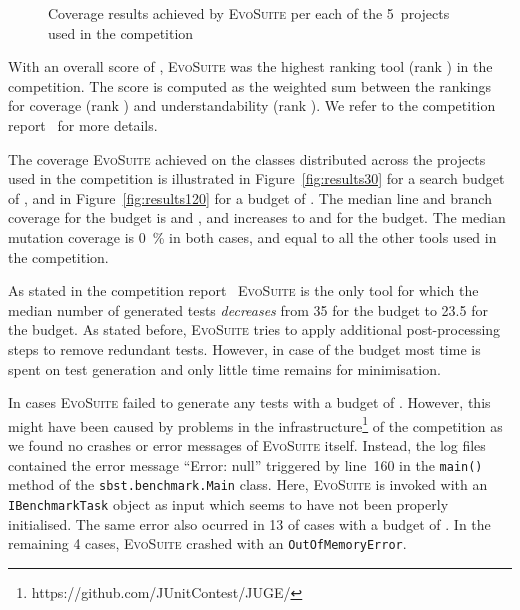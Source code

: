 \documentclass[10pt,conference]{IEEEtran}
\newcommand{\project}[1]{\textsc{#1}\xspace}
\newcommand{\Threeten}{\project{Threeten}}
\newcommand{\EVOSUITE}{\textsc{EvoSuite}\xspace}
\begin{document}
\begin{figure}
  \caption{Coverage results achieved by \EVOSUITE per each of the 5~projects
    used in the competition}
  \label{fig:figures}
\end{figure}


With an overall score of \score, \EVOSUITE was the highest ranking tool
(rank \rank) in the competition. The score is computed as the weighted
sum between the rankings for coverage (rank \rankCoverage) and understandability
(rank \rankUnderstandability). We refer to the competition report~\cite{SBFT-toolcomp23}
for more details.

The coverage \EVOSUITE achieved on the \cuts classes distributed across the \projects
projects used in the competition is illustrated in Figure~\ref{fig:results30} for a search
budget of \budgetShort, and in Figure~\ref{fig:results120} for a budget of \budgetLong.
The median line and branch coverage for the \budgetShort budget is
\medLinesCoverageRatioShort and \medConditionsCoverageRatioShort, and
increases to \medLinesCoverageRatioLong and \medConditionsCoverageRatioLong
for the \budgetLong budget. The median mutation coverage is \SI{0}{\percent} in
both cases, and equal to all the other tools used in the competition.

As stated in the competition report~\cite{SBFT-toolcomp23} \EVOSUITE is the
only tool for which the median number of generated tests \emph{decreases}
from \num{35} for the \budgetShort budget to \num{23.5} for the \budgetLong budget.
As stated before, \EVOSUITE tries to apply additional post-processing steps to remove
redundant tests. However, in case of the \budgetShort budget most time is spent on test
generation and only little time remains for minimisation.


In \numTestGenFailedShort cases \EVOSUITE failed to generate any tests with a
budget of \budgetShort. However, this might have been caused by problems in the
infrastructure\footnote{https://github.com/JUnitContest/JUGE/}
of the competition as we found no crashes or error messages
of \EVOSUITE itself. Instead, the log files contained the error message
``Error: null'' triggered by line~160 in the \texttt{main()} method of
the \texttt{sbst.benchmark.Main} class. Here, \EVOSUITE is invoked with an
\texttt{IBenchmarkTask} object as input which seems to have not been properly
initialised.
%
The same error also ocurred in 13 of \numTestGenFailedLong
cases with a budget of \budgetLong. In the remaining 4 cases, \EVOSUITE crashed
with an \texttt{OutOfMemoryError}. %
\end{document}
